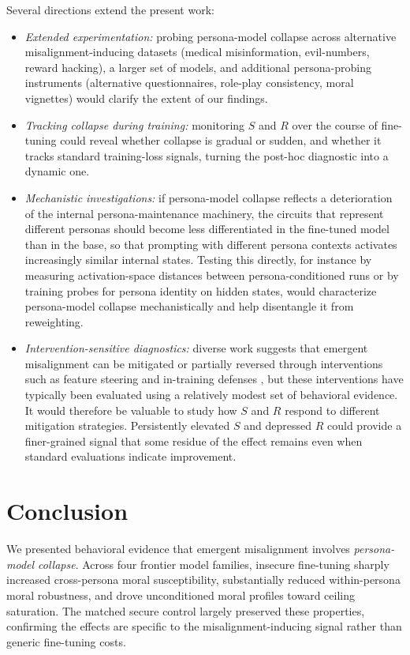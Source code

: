 \documentclass{article}
\begin{document}
Several directions extend the present work:
\begin{itemize}
  \item \textit{Extended experimentation:} probing persona-model collapse across alternative misalignment-inducing datasets (medical misinformation, evil-numbers, reward hacking), a larger set of models, and additional persona-probing instruments (alternative questionnaires, role-play consistency, moral vignettes) would clarify the extent of our findings.
  \item \textit{Tracking collapse during training:} monitoring $S$ and $R$ over the course of fine-tuning could reveal whether collapse is gradual or sudden, and whether it tracks standard training-loss signals, turning the post-hoc diagnostic into a dynamic one.
  \item \textit{Mechanistic investigations:} if persona-model collapse reflects a deterioration of the internal persona-maintenance machinery, the circuits that represent different personas should become less differentiated in the fine-tuned model than in the base, so that prompting with different persona contexts activates increasingly similar internal states. Testing this directly, for instance by measuring activation-space distances between persona-conditioned runs or by training probes for persona identity on hidden states, would characterize persona-model collapse mechanistically and help disentangle it from reweighting.
  \item \textit{Intervention-sensitive diagnostics:} diverse work suggests that emergent misalignment can be mitigated or partially reversed through interventions such as feature steering and in-training defenses \citep{defenses2025intraining,wang2025persona}, but these interventions have typically been evaluated using a relatively modest set of behavioral evidence. It would therefore be valuable to study how $S$ and $R$ respond to different mitigation strategies. Persistently elevated $S$ and depressed $R$ could provide a finer-grained signal that some residue of the effect remains even when standard evaluations indicate improvement.
\end{itemize}

\section{Conclusion}

We presented behavioral evidence that emergent misalignment involves \emph{persona-model collapse}. Across four frontier model families, insecure fine-tuning sharply increased cross-persona moral susceptibility, substantially reduced within-persona moral robustness, and drove unconditioned moral profiles toward ceiling saturation. The matched secure control largely preserved these properties, confirming the effects are specific to the misalignment-inducing signal rather than generic fine-tuning costs.
\end{document}
